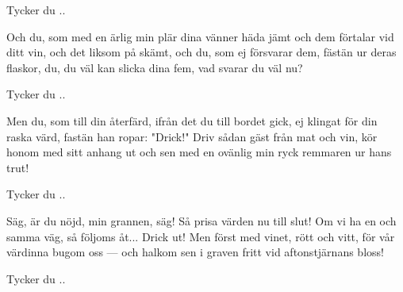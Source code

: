 \beginchorus						%
Tycker du ..
\endchorus

\beginverse*
Och du, som med en ärlig min
plär dina vänner häda jämt
och dem förtalar vid ditt vin,
och det liksom på skämt,
och du, som ej försvarar dem,
fästän ur deras flaskor, du,
du väl kan slicka dina fem,
vad svarar du väl nu?
\endverse

\beginchorus						%
Tycker du ..
\endchorus

\beginverse*
Men du, som till din återfärd,
ifrån det du till bordet gick,
ej klingat för din raska värd,
fastän han ropar: "Drick!"
Driv sådan gäst från mat och vin,
kör honom med sitt anhang ut
och sen med en ovänlig min
ryck remmaren ur hans trut!
\endverse

\beginchorus						%
Tycker du ..
\endchorus

\beginverse*
Säg, är du nöjd, min grannen, säg!
Så prisa värden nu till slut!
Om vi ha en och samma väg,
så följoms åt... Drick ut!
Men först med vinet, rött och vitt,
för vår värdinna bugom oss —
och halkom sen i graven fritt
vid aftonstjärnans bloss!
\endverse

\beginchorus						%
Tycker du ..
\endchorus

\endsong							%